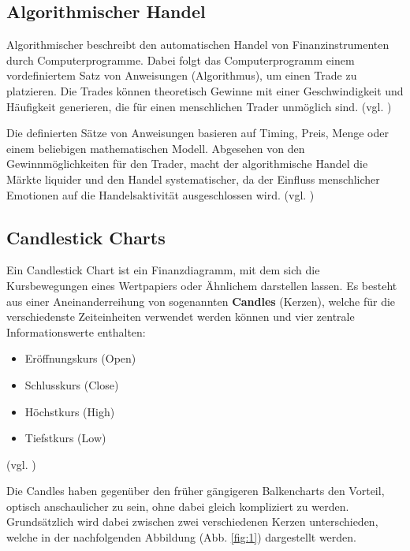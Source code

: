 \documentclass[oneside]{ausarbeitung}
\begin{document}
\subsection{Algorithmischer Handel}
\label{sub:algorithmischer_handel}

Algorithmischer beschreibt den automatischen Handel von
Finanzinstrumenten durch Computerprogramme. Dabei folgt das
Computerprogramm einem vordefiniertem Satz von Anweisungen
(Algorithmus), um einen Trade zu platzieren. Die Trades können
theoretisch Gewinne mit einer Geschwindigkeit und Häufigkeit
generieren, die für einen menschlichen Trader unmöglich sind. (vgl.
\cite{algorithmic_trading})

Die definierten Sätze von Anweisungen basieren auf Timing, Preis,
Menge oder einem beliebigen mathematischen Modell. Abgesehen von den
Gewinnmöglichkeiten für den Trader, macht der algorithmische Handel
die Märkte liquider und den Handel systematischer, da der Einfluss
menschlicher Emotionen auf die Handelsaktivität ausgeschlossen wird.
(vgl. \cite{algorithmic_trading})

\subsection{Candlestick Charts}
\label{sub:candlestick_charts}

Ein Candlestick Chart ist ein Finanzdiagramm, mit dem sich die
Kursbewegungen eines Wertpapiers oder Ähnlichem darstellen lassen. Es
besteht aus einer Aneinanderreihung von sogenannten \textbf{Candles}
(Kerzen), welche für die verschiedenste Zeiteinheiten verwendet
werden können und vier zentrale Informationswerte enthalten:

\begin{itemize}
	\item Eröffnungskurs (Open)
	\item Schlusskurs (Close)
	\item Höchstkurs (High)
	\item Tiefstkurs (Low)
\end{itemize}

(vgl. \cite{candlestick_basics})

Die Candles haben gegenüber den früher gängigeren Balkencharts den
Vorteil, optisch anschaulicher zu sein, ohne dabei gleich kompliziert
zu werden. Grundsätzlich wird dabei zwischen zwei verschiedenen
Kerzen unterschieden, welche in der nachfolgenden Abbildung
(Abb. \ref{fig:1}) dargestellt werden. \\
\end{document}
